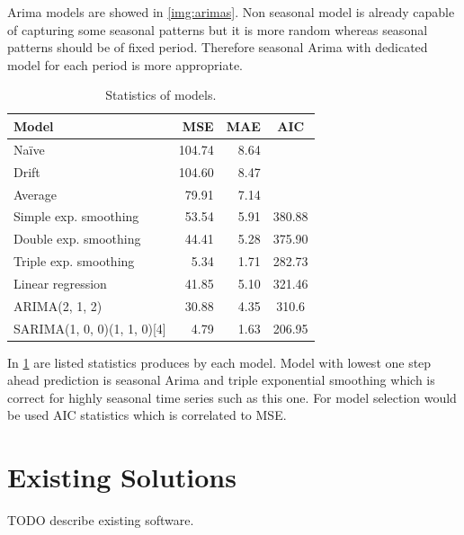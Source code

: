     Arima models are showed in \ref{img:arimas}. Non seasonal model is already capable of capturing some seasonal
    patterns but it is more random whereas seasonal patterns should be of fixed period. Therefore seasonal Arima with
    dedicated model for each period is more appropriate.

    \begin{table}[h]
        \begin{center}
            \begin{tabular}{l|r|r|c}
                    \textbf{Model} & \textbf{MSE} & \textbf{MAE} & \textbf{AIC} \\ \hline \hline
                    Na\"{i}ve & 104.74 & 8.64 & \\
                    Drift & 104.60 & 8.47 & \\
                    Average & 79.91 & 7.14 & \\ \hline
                    Simple exp. smoothing & 53.54 & 5.91 & 380.88 \\
                    Double exp. smoothing & 44.41 & 5.28 & 375.90 \\
                    Triple exp. smoothing & 5.34 & 1.71 & 282.73 \\ \hline
                    Linear regression & 41.85 & 5.10 & 321.46 \\ \hline
                    ARIMA(2, 1, 2) & 30.88 & 4.35 & 310.6 \\
                    SARIMA(1, 0, 0)(1, 1, 0)[4] & 4.79 & 1.63 & 206.95 \\
            \end{tabular}
            \caption{Statistics of models.}
            \label{tab:models-stat}
        \end{center}
    \end{table}

    In \ref{tab:models-stat} are listed statistics produces by each model. Model with lowest one step ahead prediction
    is seasonal Arima and triple exponential smoothing which is correct for highly seasonal time series such as this
    one. For model selection would be used AIC statistics which is correlated to MSE.

\chapter{Existing Solutions}
TODO describe existing software.

